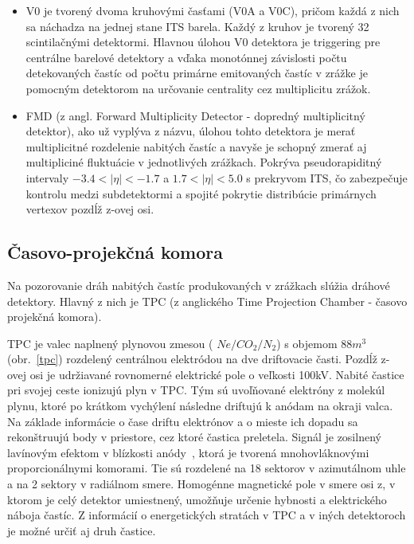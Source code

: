 \documentclass[thesismargins, thesislinespacing]{rnthesis}
\begin{document}
\begin{itemize}

	\item V0 je tvorený dvoma kruhovými časťami (V0A a V0C), pričom každá z nich sa náchadza na jednej stane ITS barela. Každý z kruhov je tvorený 32 scintilačnými detektormi. Hlavnou úlohou V0 detektora je triggering pre centrálne barelové detektory a vďaka monotónnej závislosti počtu detekovaných častíc od počtu primárne emitovaných častíc v zrážke je pomocným detektorom na určovanie centrality cez multiplicitu zrážok.  
	\item FMD (z angl. Forward Multiplicity Detector - dopredný multiplicitný detektor), ako už vyplýva z názvu, úlohou tohto detektora je merať multiplicitné rozdelenie nabitých častíc a navyše je schopný zmerať aj multipliciné fluktuácie v jednotlivých zrážkach. Pokrýva pseudorapiditný intervaly $-3.4<|\eta|<-1.7$ a $1.7<|\eta|<5.0$  s prekryvom ITS, čo zabezpečuje kontrolu medzi subdetektormi  a spojité pokrytie distribúcie primárnych vertexov pozdĺž z-ovej osi.	 
\end{itemize}

\subsection{Časovo-projekčná komora}
\label{textTPC}
Na pozorovanie dráh nabitých častíc produkovaných v zrážkach slúžia dráhové detektory. Hlavný z nich je TPC (z anglického Time Projection Chamber - časovo projekčná komora).

TPC je valec naplnený plynovou zmesou ( $Ne/CO_2/N_2$) s objemom $88m^3$ (obr.~\ref{tpc}) rozdelený centrálnou elektródou na dve driftovacie časti. Pozdĺž z-ovej osi je udržiavané rovnomerné elektrické pole o veľkosti 100kV. Nabité častice pri svojej ceste ionizujú plyn v TPC. Tým sú uvoľňované elektróny z molekúl plynu, ktoré po krátkom vychýlení následne driftujú k anódam na okraji valca. Na základe informácie o čase driftu elektrónov a o mieste ich dopadu sa rekonštruujú body v priestore, cez ktoré častica preletela. Signál je zosilnený lavínovým efektom v blízkosti anódy~\cite{TPCobr}, ktorá je tvorená mnohovláknovými proporcionálnymi komorami. Tie sú rozdelené na 18 sektorov v azimutálnom uhle a na 2 sektory v radiálnom smere. Homogénne magnetické pole v smere osi z, v ktorom je celý detektor umiestnený, umožňuje určenie hybnosti a elektrického náboja častíc. Z informácií o energetických stratách v TPC a v iných detektoroch je možné určiť aj druh častice. 
\end{document}
